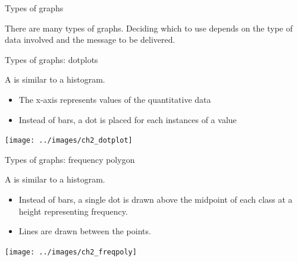 \documentclass[xcolor=table, handout]{beamer}
\begin{document}
\begin{frame}{Types of graphs}

\begin{block}{}
There are many types of graphs. Deciding which to use depends on the type of data involved and the message to be delivered.
\end{block}
\end{frame}

\begin{frame}{Types of graphs: dotplots}
\begin{block}{}
A  is similar to a histogram. 
\begin{itemize}
\item The x-axis represents values of the quantitative data
\item Instead of bars, a dot is placed for each instances of a value
\end{itemize}
\end{block}
\bigskip
{\centering
\texttt{[image: ../images/ch2\_dotplot]}
\par}
\end{frame}

\begin{frame}{Types of graphs: frequency polygon}
\begin{block}{}
A  is similar to a histogram.
\begin{itemize}
\item Instead of bars, a single dot is drawn above the midpoint of each class at a height representing frequency.
\item Lines are drawn between the points.
\end{itemize} 
\end{block}
\bigskip
{\centering
\texttt{[image: ../images/ch2\_freqpoly]}
\par}

\end{frame}
\end{document}
